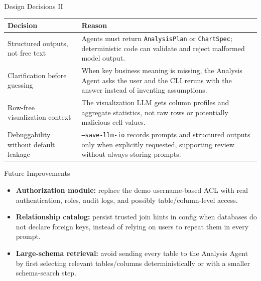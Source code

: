 \documentclass[aspectratio=169]{beamer}
\newcommand{\code}[1]{\texttt{\small #1}}
\begin{document}
\begin{frame}{Design Decisions II}
  \footnotesize
  \begin{tabular}{p{} p{}}
    \toprule
    \textbf{Decision} & \textbf{Reason} \\
    \midrule
    Structured outputs, not free text &
    Agents must return \code{AnalysisPlan} or \code{ChartSpec}; deterministic
    code can validate and reject malformed model output. \\
    \addlinespace
    Clarification before guessing &
    When key business meaning is missing, the Analysis Agent asks the user and
    the CLI reruns with the answer instead of inventing assumptions. \\
    \addlinespace
    Row-free visualization context &
    The visualization LLM gets column profiles and aggregate statistics, not
    raw rows or potentially malicious cell values. \\
    \addlinespace
    Debuggability without default leakage &
    \code{--save-llm-io} records prompts and structured outputs only when
    explicitly requested, supporting review without always storing prompts. \\
    \bottomrule
  \end{tabular}
\end{frame}

\begin{frame}{Future Improvements}
  \small
  \begin{itemize}
    \item \textbf{Authorization module:} replace the demo username-based ACL with
    real authentication, roles, audit logs, and possibly table/column-level access.
    \item \textbf{Relationship catalog:} persist trusted join hints in config when
    databases do not declare foreign keys, instead of relying on users to repeat
    them in every prompt.
    \item \textbf{Large-schema retrieval:} avoid sending every table to the
    Analysis Agent by first selecting relevant tables/columns deterministically or
    with a smaller schema-search step.
  \end{itemize}
\end{frame}
\end{document}
